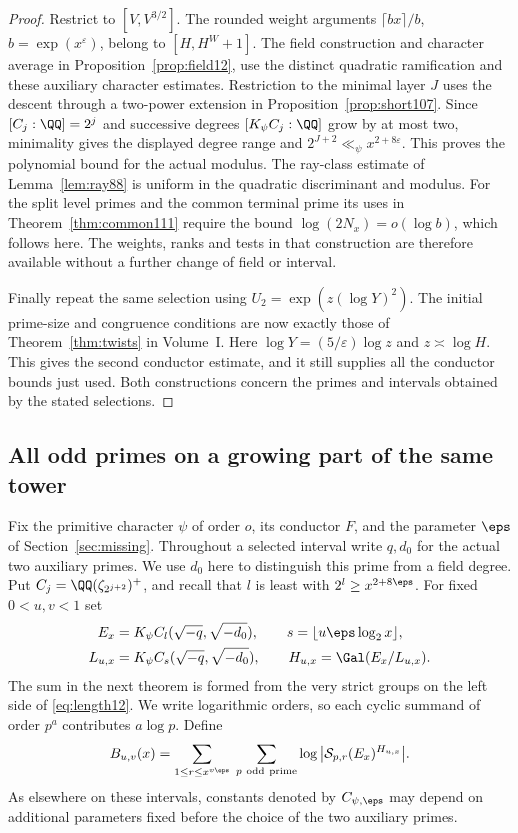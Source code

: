 \documentclass[a4paper,11pt]{article}
\theoremstyle{definition}
\theoremstyle{remark}
\numberwithin{equation}{section}
\begin{document}
\begin{proof}
Restrict to \([V,V^{3/2}]\). The rounded weight arguments
\(\lceil bx\rceil/b\), \(b=\exp(x^\varepsilon)\), belong to
\([H,H^W+1]\). The field construction and character average in
Proposition~\ref{prop:field12}, use the distinct
quadratic ramification and these auxiliary character estimates.
Restriction to the minimal layer \(J\) uses the descent through a two-power extension in Proposition~\ref{prop:short107}. Since \([C_j:\QQ]=2^j\)
and successive degrees \([K_\psi C_j:\QQ]\) grow by at most two,
minimality gives the displayed degree range and
\(2^{J+2}\ll_\psi x^{2+8\varepsilon}\). This proves the
polynomial bound for the actual modulus.
The ray-class estimate of Lemma~\ref{lem:ray88} is uniform in the
quadratic discriminant and modulus. For the split level primes
and the common terminal prime its uses in Theorem~\ref{thm:common111}
require the bound \(\log(2N_x)=o(\log b)\), which follows here.
The weights, ranks and tests in that construction are therefore
available without a further change of field or interval.

Finally repeat the same selection using
\(U_2=\exp(z(\log Y)^2)\). The initial prime-size and congruence
conditions are now exactly those of Theorem~\ref{thm:twists} in Volume~I.
Here \(\log Y=(5/\varepsilon)\log z\) and \(z\asymp\log H\).
This gives the second conductor estimate, and it still supplies
all the conductor bounds just used. Both constructions concern
the primes and intervals obtained by the stated selections.
\end{proof}

\subsection{All odd primes on a growing part of the same tower}\label{nav:II-29}
Fix the primitive character \(\psi\) of order \(o\), its conductor
\(F\), and the parameter \(\eps\) of Section~\ref{sec:missing}.
Throughout a selected interval write \(q,d_0\) for the actual
two auxiliary primes. We use \(d_0\) here to distinguish this
prime from a field degree. Put \(C_j=\QQ(\zeta_{2^{j+2}})^+\),
and recall that \(l\) is least with \(2^l\ge x^{2+8\eps}\).
For fixed \(0<u,v<1\) set
\[
\begin{split}
 E_x&=K_\psi C_l(\sqrt{-q},\sqrt{-d_0}),\qquad
 s=\lfloor u\eps\log_2 x\rfloor,\\
 L_{u,x}&=K_\psi C_s(\sqrt{-q},\sqrt{-d_0}),\qquad
 H_{u,x}=\Gal(E_x/L_{u,x}).
\end{split}
\]
The sum in the next theorem is formed from the very strict groups
on the left side of \eqref{eq:length12}. We write logarithmic
orders, so each cyclic summand of order \(p^a\) contributes
\(a\log p\). Define
\[
 B_{u,v}(x)=
 \sum_{1\le r\le x^{v\eps}}\;\sum_{p\ {\rm odd\ prime}}
       \log\big|\mathcal S_{p,r}(E_x)^{H_{u,x}}\big|.
\]
As elsewhere on these intervals, constants denoted by
\(C_{\psi,\eps}\) may depend on additional parameters fixed
before the choice of the two auxiliary primes.
\end{document}
